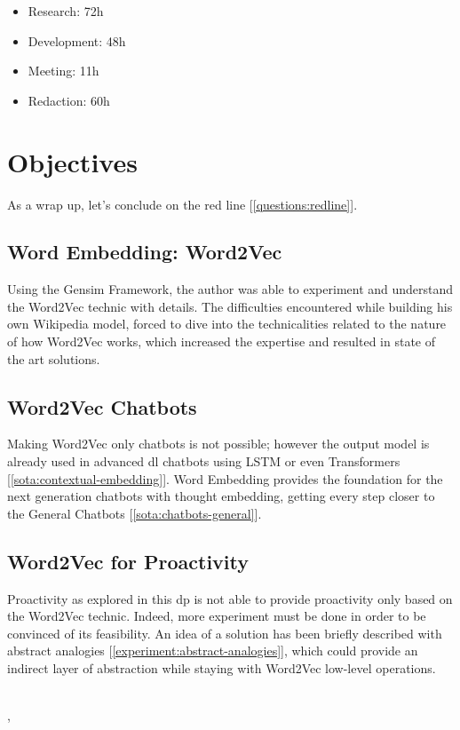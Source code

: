 \begin{itemize}
\setlength\itemsep{0em}
    \item Research: 72h
    \item Development: 48h
    \item Meeting: 11h
    \item Redaction: 60h
\end{itemize}


\section{Objectives}
As a wrap up, let's conclude on the red line [\ref{questions:redline}].

\subsection{Word Embedding: Word2Vec}
Using the Gensim Framework, the author was able to experiment and understand the Word2Vec technic with details. The difficulties encountered while building his own Wikipedia model, forced to dive into the technicalities related to the nature of how Word2Vec works, which increased the expertise and resulted in state of the art solutions.

\subsection{Word2Vec Chatbots}
Making Word2Vec only chatbots is not possible; however the output model is already used in advanced \gls{dl} chatbots using LSTM or even Transformers [\ref{sota:contextual-embedding}]. Word Embedding provides the foundation for the next generation chatbots with thought embedding, getting every step closer to the General Chatbots [\ref{sota:chatbots-general}].


\subsection{Word2Vec for Proactivity}
Proactivity as explored in this \gls{dp} is not able to provide proactivity only based on the Word2Vec technic. Indeed, more experiment must be done in order to be convinced of its feasibility. An idea of a solution has been briefly described with abstract analogies [\ref{experiment:abstract-analogies}], which could provide an indirect layer of abstraction while staying with Word2Vec low-level operations.


~\\[5cm]
\Locality, \Date
~\\[1cm]
\Author